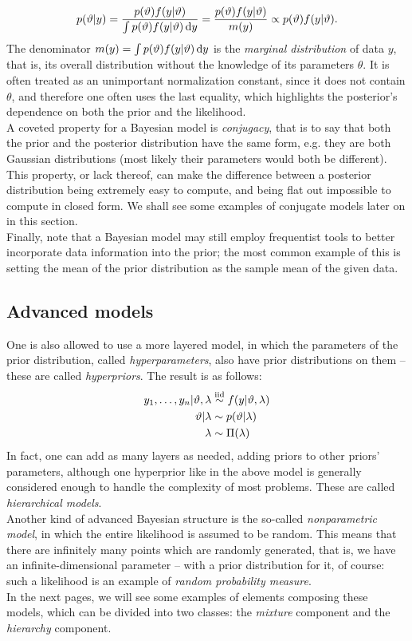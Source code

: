 $$ p(\vartheta|y) = \frac{p(\vartheta) f(y|\vartheta)}{\int p(\vartheta) f(y|\vartheta) \, \mathrm d y} =
\frac{p(\vartheta) f(y|\vartheta)}{m(y)} \propto p(\vartheta) f(y|\vartheta).
$$
The denominator $m(y) = \int p(\vartheta) f(y|\vartheta) \, \mathrm d y$ is the \emph{marginal distribution} of data $y$, that is, its overall distribution without the knowledge of its parameters $\theta$.
It is often treated as an unimportant normalization constant, since it does not contain $\theta$, and therefore one often uses the last equality, which highlights the posterior's dependence on both the prior and the likelihood. \\
A coveted property for a Bayesian model is \emph{conjugacy}, that is to say that both the prior and the posterior distribution have the same form, e.g. they are both Gaussian distributions (most likely their parameters would both be different).
This property, or lack thereof, can make the difference between a posterior distribution being extremely easy to compute, and being flat out impossible to compute in closed form.
We shall see some examples of conjugate models later on in this section. \\
Finally, note that a Bayesian model may still employ frequentist tools to better incorporate data information into the prior; the most common example of this is setting the mean of the prior distribution as the sample mean of the given data.

\subsection{Advanced models} %
One is also allowed to use a more layered model, in which the parameters of the prior distribution, called \emph{hyperparameters}, also have prior distributions on them -- these are called \emph{hyperpriors}.
The result is as follows:
\begin{align*}
	y_1, \dots, y_n | \theta, \lambda &\iidsim f(y|\theta, \lambda) \\ %
	\theta | \lambda &\sim p(\theta|\lambda) \\
	\lambda &\sim \Pi(\lambda)
\end{align*}
In fact, one can add as many layers as needed, adding priors to other priors' parameters, although one hyperprior like in the above model is generally considered enough to handle the complexity of most problems.
These are called \emph{hierarchical models}. \\
Another kind of advanced Bayesian structure is the so-called \emph{nonparametric model}, in which the entire likelihood is assumed to be random.
This means that there are infinitely many points which are randomly generated, that is, we have an infinite-dimensional parameter -- with a prior distribution for it, of course:
such a likelihood is an example of \emph{random probability measure}. \\
In the next pages, we will see some examples of elements composing these models, which can be divided into two classes: the \emph{mixture} component and the \emph{hierarchy} component.


